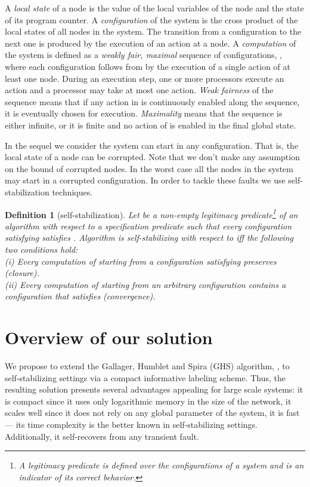\documentclass[11pt,a4paper]{article}
\newtheorem{definition}{Definition}
\begin{document}
A {\it local state} of a node is the value of the local variables of the node and the state of its program counter. A {\it configuration} of the system  is the cross product of the local states of all nodes in the system. The transition from a configuration to the next one is produced by the execution of an action at a node. A {\it computation} of the system is defined as a \emph{weakly fair, maximal} sequence of configurations, , where each configuration  follows from  by the execution of a single action of at least one node. During an execution step, one or more processors execute an action and a processor may take at most one action. \emph{Weak fairness} of the sequence means that if any action in  is continuously enabled along the sequence, it is eventually chosen for execution. \emph{Maximality} means that the sequence is either infinite, or it is finite and no action of  is enabled in the final global state.

In the sequel we consider the system can start in any configuration. That is, the local state of a node can be corrupted. Note that we don't make any assumption on the bound of corrupted nodes. In the worst case all the nodes in the system may start in a corrupted configuration. In order to tackle these faults we use self-stabilization techniques.

\begin{definition}[self-stabilization]
Let  be a non-empty \emph{legitimacy predicate}\footnote{A legitimacy predicate is defined over the configurations of a system and is an indicator of its correct behavior.} of an algorithm  with respect to a specification predicate  such that every configuration satisfying  satisfies . Algorithm  is \emph{self-stabilizing} with respect to  iff the following two conditions hold:\\
\textsf{(i)} Every computation of  starting from a configuration satisfying  preserves  (\emph{closure}).  \\
\textsf{(ii)} Every computation of  starting from an arbitrary configuration contains a configuration that satisfies  (\emph{convergence}).
\end{definition}

\section{Overview of our solution}
We propose to extend the Gallager, Humblet and Spira (GHS) algorithm, 
\cite{GallagerHS83}, 
to self-stabilizing settings via a compact informative labeling scheme.
Thus, the resulting solution presents several advantages 
appealing for large scale systems: it is compact since it 
uses only logarithmic memory in the size of the network, 
it scales well since it does not rely on any global 
parameter of the system, it is fast --- its time complexity is the 
better known in self-stabilizing settings. Additionally, it self-recovers 
from any transient fault.
\end{document}

